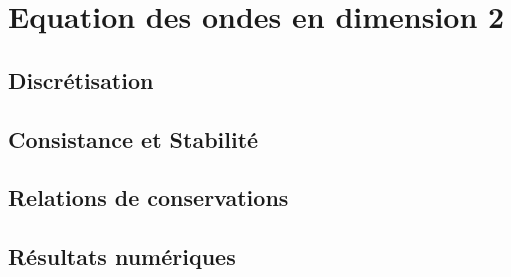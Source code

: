 \section{Equation des ondes en dimension 2}

\subsection{Discrétisation}

\subsection{Consistance et Stabilité}

\subsection{Relations de conservations}

\subsection{Résultats numériques}